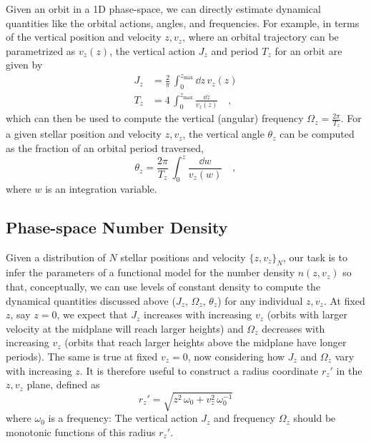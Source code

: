 Given an orbit in a 1D phase-space, we can directly estimate dynamical quantities like
the orbital actions, angles, and frequencies.
For example, in terms of the vertical position and velocity $z, v_z$, where an orbital
trajectory can be parametrized as $v_z(z)$, the vertical action $J_z$ and period $T_z$
for an orbit are given by
\begin{align}
    J_z &= \frac{2}{\pi} \, \int_0^{z_{\textrm{max}}} \dd z \, v_z(z) \\
    T_z &= 4 \, \int_0^{z_{\textrm{max}}} \frac{\dd z}{v_z(z)}\quad ,
\end{align}
which can then be used to compute the vertical (angular) frequency $\Omega_z =
\frac{2\pi}{T_z}$.
For a given stellar position and velocity $z, v_z$, the vertical angle $\theta_z$ can be
computed as the fraction of an orbital period traversed,
\begin{equation}
    \theta_z = \frac{2\pi}{T_z} \, \int_0^{z} \frac{\dd w}{v_z(w)} \quad ,
\end{equation}
where $w$ is an integration variable.

\subsection{Phase-space Number Density}

Given a distribution of $N$ stellar positions and velocity $\{z, v_z\}_N$, our task is
to infer the parameters of a functional model for the number density $n(z, v_z)$ so
that, conceptually, we can use levels of constant density to compute the dynamical
quantities discussed above ($J_z$, $\Omega_z$, $\theta_z$) for any individual $z, v_z$.
At fixed $z$, say $z=0$, we expect that $J_z$ increases with increasing $v_z$ (orbits
with larger velocity at the midplane will reach larger heights) and $\Omega_z$
decreases with increasing $v_z$ (orbits that reach larger heights above the midplane
have longer periods).
The same is true at fixed $v_z=0$, now considering how $J_z$ and $\Omega_z$ vary with
increasing $z$.
It is therefore useful to construct a radius coordinate $r_z'$ in the $z, v_z$ plane,
defined as
\begin{equation}
    r_z' = \sqrt{z^2 \, \omega_0 + v_z^2 \, \omega_0^{-1}}
\end{equation}
where $\omega_0$ is a frequency:
The vertical action $J_z$ and frequency $\Omega_z$ should be monotonic functions of this
radius $r_z'$.

